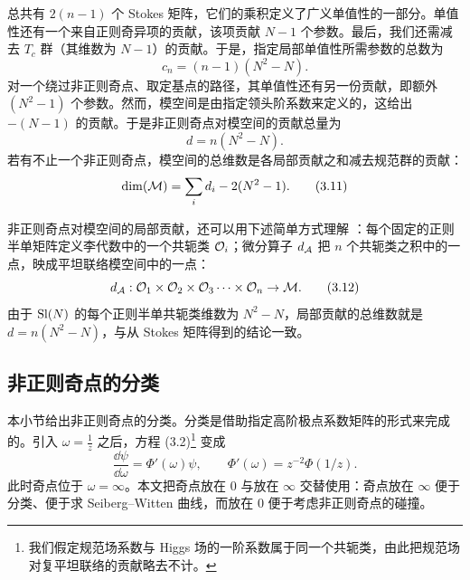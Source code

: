 总共有 $2(n-1)$ 个 Stokes 矩阵，它们的乘积定义了广义单值性的一部分。单值性还有一个来自正则奇异项的贡献，该项贡献 $N-1$ 个参数。最后，我们还需减去 $T_c$ 群（其维数为 $N-1$）的贡献。于是，指定局部单值性所需参数的总数为
\begin{equation}
c_n = (n-1)(N^2 - N).
\label{eq:3.9}\tag{3.9}
\end{equation}
对一个绕过非正则奇点、取定基点的路径，其单值性还有另一份贡献，即额外 $(N^2-1)$ 个参数。然而，模空间是由指定领头阶系数来定义的，这给出 $-(N-1)$ 的贡献。于是非正则奇点对模空间的贡献总量为
\begin{equation}
d = n(N^2 - N).
\label{eq:3.10}\tag{3.10}
\end{equation}
若有不止一个非正则奇点，模空间的总维数是各局部贡献之和减去规范群的贡献：
\begin{equation}
\dim(\mathcal{M}) = \sum_i d_i - 2(N^2 - 1).
\label{eq:3.11}\tag{3.11}
\end{equation}


非正则奇点对模空间的局部贡献，还可以用下述简单方式理解 \cite{28}：每个固定的正则半单矩阵定义李代数中的一个共轭类 $\mathcal{O}_i$；微分算子 $d_{\mathcal{A}}$ 把 $n$ 个共轭类之积中的一点，映成平坦联络模空间中的一点：
\begin{equation}
d_{\mathcal{A}}: \mathcal{O}_1\times\mathcal{O}_2\times\mathcal{O}_3\cdots\times\mathcal{O}_n \to \mathcal{M} .
\label{eq:3.12}\tag{3.12}
\end{equation}
由于 $\operatorname{Sl}(N)$ 的每个正则半单共轭类维数为 $N^2-N$，局部贡献的总维数就是 $d = n(N^2-N)$，与从 Stokes 矩阵得到的结论一致。

\subsection{非正则奇点的分类}
\label{sec:3.1}

本小节给出非正则奇点的分类。分类是借助指定高阶极点系数矩阵的形式来完成的。引入 $\omega = \tfrac{1}{z}$ 之后，方程 (3.2)\footnote{我们假定规范场系数与 Higgs 场的一阶系数属于同一个共轭类，由此把规范场对复平坦联络的贡献略去不计。} 变成
\begin{equation}
\frac{\dd\psi}{\dd\omega} = \Phi'(\omega)\psi,\qquad
\Phi'(\omega) = z^{-2}\Phi(1/z).
\label{eq:3.13}\tag{3.13}
\end{equation}
此时奇点位于 $\omega = \infty$。本文把奇点放在 $0$ 与放在 $\infty$ 交替使用：奇点放在 $\infty$ 便于分类、便于求 Seiberg--Witten 曲线，而放在 $0$ 便于考虑非正则奇点的碰撞。

